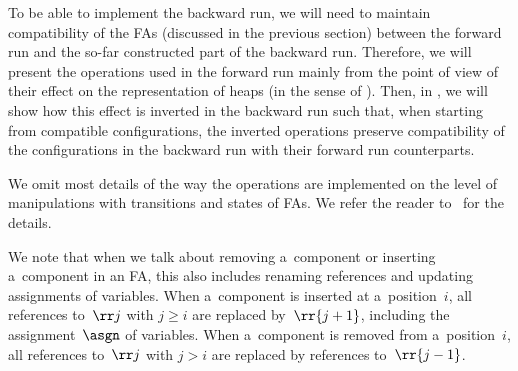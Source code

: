 %
To be able to implement the backward run, we will need to maintain
compatibility of the FAs (discussed in the previous section) between the forward run and
the so-far constructed part of the backward run.
%
Therefore, we will present the operations used in the forward run mainly from
the point of view of their effect on the representation  of heaps (in the sense
of ).
%
Then, in , we will show how this effect is inverted in
the backward run such that, when starting from compatible
configurations, the inverted operations preserve compatibility of the
configurations in the backward run with their forward run counterparts.



%
We omit most details of the way the operations are implemented on the level of
manipulations with transitions and states of FAs. 
We refer the reader to~\cite{forester11,jiri:diza} for the
details.

We note that when we talk about removing a~component or inserting a~component
in an FA, this also includes renaming references and updating
assignments of variables.
%
When a~component is inserted at a~position~$i$, all references to~$\rr j$ with
$j \geq i$ are replaced by~$\rr{j+1}$, including the assignment~$\asgn$ of variables.
%
When a~component is removed from a~position~$i$, all references to~$\rr j$ with $j > i$ are
replaced by references to~$\rr{j-1}$. 




